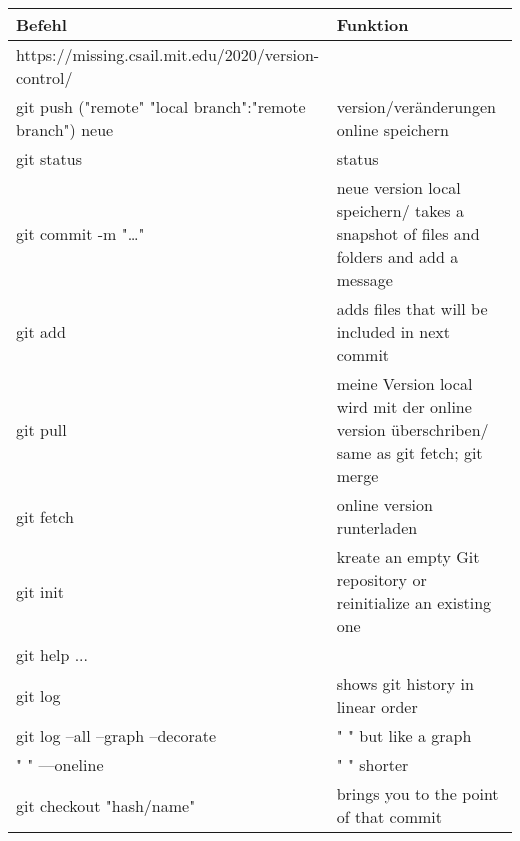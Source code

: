 




\begin{center}
    \begin{tabular}{ |  p{8cm}  |   p{8cm}  |}
    \hline  

        Befehl  &   Funktion\\
        \hline
        https://missing.csail.mit.edu/2020/version-control/	& \\
        \hline
        git push ("remote" "local branch":"remote branch")	neue    &    version/veränderungen online speichern \\
        \hline
        git status	    &   status \\
        \hline
        git commit -m "…"	&   neue version local speichern/ takes a snapshot of files and folders and add a message \\
        \hline
        git add	    &   adds files that will be included in next commit \\
        \hline
        git pull	&   meine Version local wird mit der online version überschriben/ same as git fetch; git merge \\
        \hline
        git fetch	&   online version runterladen \\
        \hline
        git init	&   kreate an empty Git repository or reinitialize an existing one \\
        \hline
        git help ...	& \\
        \hline
        git log	    &   shows git history in linear order \\
        \hline
        git log --all --graph --decorate	&   " " but like a graph \\
        \hline
        " " —oneline	 &  " " shorter \\
        \hline
        git checkout "hash/name"	&   brings you to the point of that commit \\
        \hline
    \end{tabular}
\end{center}




